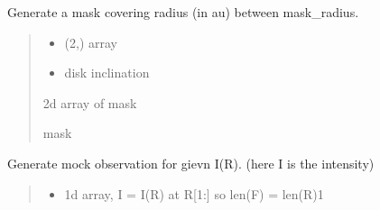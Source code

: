 \documentclass[a4paper,11pt,english]{sphinxmanual}
\begin{document}
\begin{fulllineitems}

\begin{fulllineitems}
\label{\detokenize{x22:disk_model.DiskImage.generate_mask}}
\pysigstartsignatures
\pysiglinewithargsret
{}
{\sphinxparamcomma {}}
{}
\pysigstopsignatures
\sphinxAtStartPar
Generate a mask covering radius (in au) between mask\_radius.
\begin{quote}\begin{description}
\begin{itemize}
\item {} 
\sphinxAtStartPar
{} \textendash{} (2,) array

\item {} 
\sphinxAtStartPar
{} \textendash{} disk inclination

\end{itemize}

\sphinxAtStartPar
2d array of mask

\sphinxAtStartPar
mask

\end{description}\end{quote}

\end{fulllineitems}


\begin{fulllineitems}
\label{\detokenize{x22:disk_model.DiskImage.generate_mock_observation}}
\pysigstartsignatures
\pysiglinewithargsret
{}
{\sphinxparamcomma {}\sphinxparamcomma {}}
{}
\pysigstopsignatures
\sphinxAtStartPar
Generate mock observation for gievn I(R). (here I is the intensity)
\begin{quote}\begin{description}
\begin{itemize}
\item {} 
\sphinxAtStartPar
{} \textendash{} 1d array, I = I(R) at R{[}1:{]}
so len(F) = len(R)\sphinxhyphen{}1


\end{itemize}
\end{description}
\end{quote}
\end{fulllineitems}
\end{fulllineitems}
\end{document}
